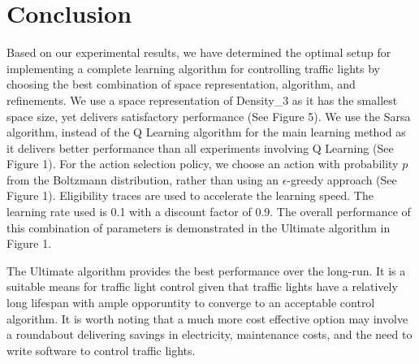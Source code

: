 \section {Conclusion}

Based on our experimental results, we have determined the optimal setup for
implementing a complete learning algorithm for controlling traffic lights by
choosing the best combination of space representation, algorithm, and
refinements. We use a space representation of Density\_3 as it has the smallest
space size, yet delivers satisfactory performance (See Figure 5). We use the
Sarsa algorithm, instead of the Q Learning algorithm for the main learning
method as it delivers better performance than all experiments involving Q
Learning (See Figure 1). For the action selection policy, we choose an action
with probability $p$ from the Boltzmann distribution, rather than using an
$\epsilon$-greedy approach (See Figure 1). Eligibility traces are used to
accelerate the learning speed. The learning rate used is 0.1 with a discount
factor of 0.9. The overall performance of this combination of parameters is
demonstrated in the Ultimate algorithm in Figure 1.

The Ultimate algorithm provides the best performance over the long-run. It is a
suitable means for traffic light control given that traffic lights have a
relatively long lifespan with ample opporuntity to converge to an acceptable
control algorithm. It is worth noting that a much more cost effective option may
involve a roundabout delivering savings in electricity, maintenance costs, and
the need to write software to control traffic lights.
